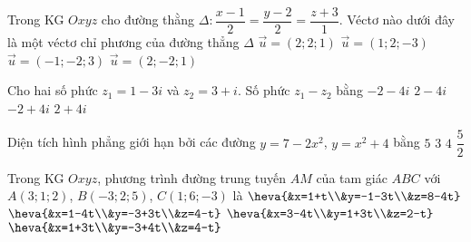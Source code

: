 \begin{ex}%
Trong KG $Oxyz$ cho đường thằng $\Delta: \dfrac{x-1}{2}=\dfrac{y-2}{2}=\dfrac{z+3}{1}$. Véctơ nào dưới đây là một véctơ chỉ phương của đường thẳng $\Delta$
\choice
{\True $\overrightarrow{u}=\left( 2;2;1\right) $}
{$\overrightarrow{u}=\left( 1;2;-3\right) $}
{$\overrightarrow{u}=\left( -1;-2;3\right) $}
{$\overrightarrow{u}=\left( 2;-2;1 \right) $}
\end{ex}

\begin{ex}%
Cho hai số phức $z_1=1-3i$ và $z_2=3+i$. Số phức $z_1-z_2$ bằng
\choice
{\True $-2-4i$}
{$2-4i$}
{$-2+4i$}
{$2+4i$}
\end{ex}

\begin{ex}%
Diện tích hình phẳng giới hạn bởi các đường $ y=7-2x^2$, $ y=x^2+4$ bằng
\choice
{$5$}
{$3$}
{\True $4$}
{$\dfrac{5}{2}$}
\end{ex}

\begin{ex}%
Trong KG $Oxyz$, phương trình đường trung tuyến $AM$ của tam giác $ABC$ với $A(3;1;2)$, $B(-3;2;5)$, $C(1;6;-3)$ là
\choice
{$\heva{&x=1+t\\&y=-1-3t\\&z=8-4t}$}
{$\heva{&x=1-4t\\&y=-3+3t\\&z=4-t}$}
{\True $\heva{&x=3-4t\\&y=1+3t\\&z=2-t}$}
{$\heva{&x=1+3t\\&y=-3+4t\\&z=4-t}$}
\end{ex}

